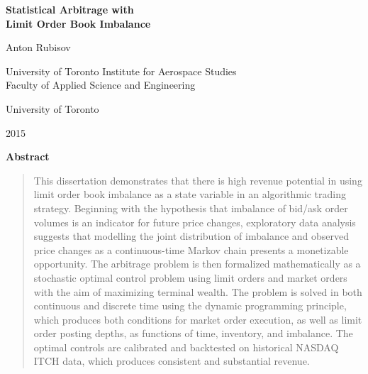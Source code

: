 \vspace*{0.25in}

\begin{center}
	{\Large\bf Statistical Arbitrage with \\ Limit Order Book Imbalance \par}
	{\large Anton Rubisov \par}
	{University of Toronto Institute for Aerospace Studies}\\
    {Faculty of Applied Science and Engineering}\\
	{University of Toronto \par}
	{2015}
\end{center}
\vspace{0.25in}	
{\Large\bf Abstract}
\vspace{0.25in}

\begin{quote}
This dissertation demonstrates that there is high revenue potential in using limit order book imbalance as a state variable in an algorithmic trading strategy. Beginning with the hypothesis that imbalance of bid/ask order volumes is an indicator for future price changes, exploratory data analysis suggests that modelling the joint distribution of imbalance and observed price changes as a continuous-time Markov chain presents a monetizable opportunity. The arbitrage problem is then formalized mathematically as a stochastic optimal control problem using limit orders and market orders with the aim of maximizing terminal wealth. The problem is solved in both continuous and discrete time using the dynamic programming principle, which produces both conditions for market order execution, as well as limit order posting depths, as functions of time, inventory, and imbalance. The optimal controls are calibrated and backtested on historical NASDAQ ITCH data, which produces consistent and substantial revenue.
\end{quote}